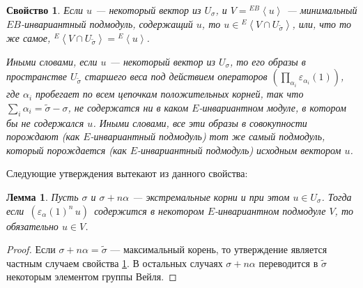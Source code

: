 \documentclass[12pt]{matmex-diploma}
\theoremstyle{mystyleni}
\newtheorem{hyp}{Свойство}
\theoremstyle{mystyle}
\newtheorem{lm}{Лемма}
\newcommand\refb[1]{\ref{#1}}
\begin{document}
\vspace{1ex}
\begin{framed}
\begin{hyp}\label{returnfromhighest}
Если $u$ --- некоторый вектор из $U_\sigma$, и $V={}^{EB}\left<u\right>$ --- минимальный \linebreak
$EB$-инвариантный подмодуль, содержащий $u$, то $u \in {}^E\left<V \cap U_{\widetilde\sigma}\right>$, или, что то же самое, ${}^E\left<V \cap U_{\widetilde\sigma}\right> = {}^E \left<u\right>$.

Иными словами, если $u$ --- некоторый вектор из $U_\sigma$, то его образы в пространстве $U_{\widetilde\sigma}$ старшего веса под действием операторов 
$\left(\prod_{\alpha_i}\varepsilon_{\alpha_i}(1)\right)$, где $\alpha_i$ пробегает по всем цепочкам положительных корней, так что $\sum_i \alpha_i = \widetilde\sigma - \sigma$, не содержатся ни в каком $E$-инвариантном модуле, в котором бы не содержался $u$. Иными словами, все эти образы в совокупности порождают (как $E$-инвариантный подмодуль) тот же самый подмодуль, который порождается (как $E$-инвариантный подмодуль) исходным вектором $u$.
\end{hyp}
\end{framed}

Следующие утверждения вытекают из данного свойства:
\begin{lm} \label{extremalweightisomorphism}
Пусть $\sigma$ и $\sigma+n\alpha$ --- экстремальные корни и при этом $u\in U_\sigma$.\linebreak
Тогда если~$(\varepsilon_\alpha(1)^n \, u) $~содержится в некотором $E$-инвариантном подмодуле $V$,\linebreak
то обязательно $u \in V$.
\end{lm}
\begin{proof}
Если $\sigma+n\alpha = \widetilde\sigma$ --- максимальный корень, то утверждение является частным случаем свойства \refb{returnfromhighest}. В остальных случаях $\sigma+n\alpha$ переводится в $\widetilde\sigma$ некоторым элементом группы Вейля.
\end{proof}
\end{document}
